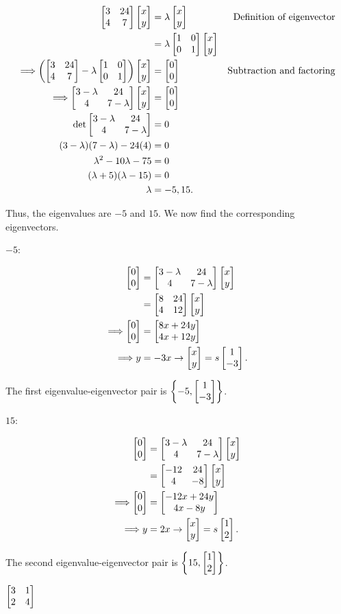 \documentclass[../gatm_answers.tex]{subfiles}
\begin{document}
\begin{align*}
\twomat{3}{24}{4}{7}\twovec{x}{y} &= \lambda\twovec{x}{y} & \text{Definition of eigenvector} \\
&= \lambda\twomat{1}{0}{0}{1}\twovec{x}{y} \\
\Longrightarrow \left(\twomat{3}{24}{4}{7}-\lambda\twomat{1}{0}{0}{1}\right)\twovec{x}{y}&=\twovec{0}{0} & \text{Subtraction and factoring} \\
\Longrightarrow \twomat{3-\lambda}{24}{4}{7-\lambda}\twovec{x}{y} &= \twovec{0}{0} \\
\det \twomat{3-\lambda}{24}{4}{7-\lambda} &= 0 \\
(3-\lambda)(7-\lambda)-24(4) &= 0 \\
\lambda^2 - 10\lambda - 75 &= 0 \\
(\lambda+5)(\lambda-15) &= 0 \\
\lambda &= -5,15.\\
\end{align*}

Thus, the eigenvalues are $-5$ and $15$. We now find the corresponding eigenvectors.

$-5$:

\begin{align*}
\twovec{0}{0} &= \twomat{3-\lambda}{24}{4}{7-\lambda}\twovec{x}{y} \\
&= \twomat{8}{24}{4}{12}\twovec{x}{y} \\
\Longrightarrow \twovec{0}{0} &= \twovec{8x+24y}{4x+12y} \\
\Longrightarrow y&=-3x \rightarrow \twovec{x}{y}=s\twovec{1}{-3}.
\end{align*}

The first eigenvalue-eigenvector pair is $\left\{-5, \twovec{1}{-3}\right\}$.

$15$:

\begin{align*}
\twovec{0}{0} &= \twomat{3-\lambda}{24}{4}{7-\lambda}\twovec{x}{y} \\
&= \twomat{-12}{24}{4}{-8}\twovec{x}{y} \\
\Longrightarrow \twovec{0}{0} &= \twovec{-12x+24y}{4x-8y} \\
\Longrightarrow y&=2x \rightarrow \twovec{x}{y}=s\twovec{1}{2}.
\end{align*}

The second eigenvalue-eigenvector pair is $\left\{15, \twovec{1}{2}\right\}$.

\begin{inner_problem}
\item $\twomat{3}{1}{2}{4}$
\end{inner_problem}
\end{document}
